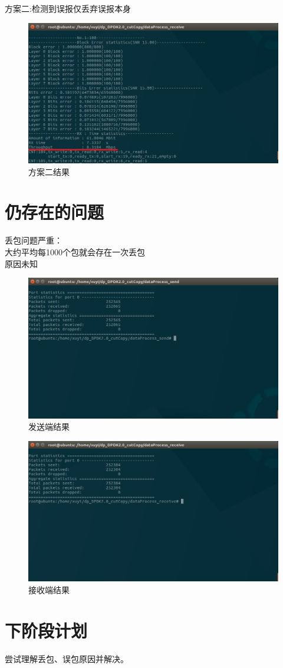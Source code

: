 \documentclass{article}
\begin{document}
\newpage
方案二:检测到误报仅丢弃误报本身\\
\begin{figure}[H]
	\centering
	\includegraphics[width = .8\textwidth]{result_throughput.png}
	\caption{方案二结果}
\end{figure}

\section{仍存在的问题}
丢包问题严重：\\
大约平均每1000个包就会存在一次丢包\\
原因未知
\begin{figure}[H]
	\centering
	\includegraphics[width = .8\textwidth]{result_drop_send.png}
	\caption{发送端结果}
\end{figure}
\begin{figure}[H]
	\centering
	\includegraphics[width = .8\textwidth]{result_drop_receive.png}
	\caption{接收端结果}
\end{figure}



\section{下阶段计划}
尝试理解丢包、误包原因并解决。
\end{document}
